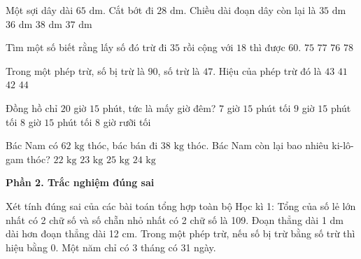 \begin{ex} %
Một sợi dây dài $65\text{ dm}$. Cắt bớt đi $28\text{ dm}$. Chiều dài đoạn dây còn lại là
\choice
{$35\text{ dm}$}
{$36\text{ dm}$}
{$38\text{ dm}$}
{\True $37\text{ dm}$}
\end{ex}

\begin{ex} %
Tìm một số biết rằng lấy số đó trừ đi $35$ rồi cộng với $18$ thì được $60$.
\choice
{$75$}
{\True $77$}
{$76$}
{$78$}
\end{ex}

\begin{ex} %
Trong một phép trừ, số bị trừ là $90$, số trừ là $47$. Hiệu của phép trừ đó là
\choice
{\True $43$}
{$41$}
{$42$}
{$44$}
\end{ex}

\begin{ex} %
Đồng hồ chỉ $20$ giờ $15$ phút, tức là mấy giờ đêm?
\choice
{$7$ giờ $15$ phút tối}
{$9$ giờ $15$ phút tối}
{\True $8$ giờ $15$ phút tối}
{$8$ giờ rưỡi tối}
\end{ex}

\begin{ex} %
Bác Nam có $62\text{ kg}$ thóc, bác bán đi $38\text{ kg}$ thóc. Bác Nam còn lại bao nhiêu ki-lô-gam thóc?
\choice
{$22\text{ kg}$}
{$23\text{ kg}$}
{$25\text{ kg}$}
{\True $24\text{ kg}$}
\end{ex}

\textbf{Phần 2. Trắc nghiệm đúng sai}

\begin{ex} %
Xét tính đúng sai của các bài toán tổng hợp toàn bộ Học kì 1:
\choiceTF
{\True Tổng của số lẻ lớn nhất có 2 chữ số và số chẵn nhỏ nhất có 2 chữ số là 109.}
{Đoạn thẳng dài 1 dm dài hơn đoạn thẳng dài 12 cm.}
{\True Trong một phép trừ, nếu số bị trừ bằng số trừ thì hiệu bằng 0.}
{Một năm chỉ có 3 tháng có 31 ngày.}
\end{ex}

